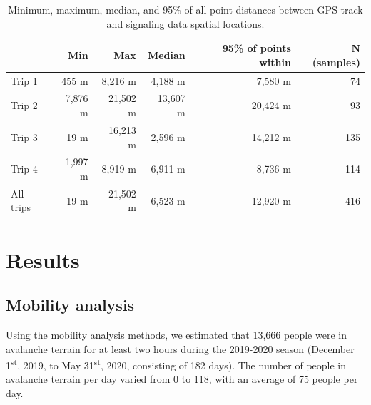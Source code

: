 \documentclass[authordate,empirical]{jote-new-article}
\begin{document}
\begin{table}[t]
  \begin{fullwidth}

    \centering
    \caption{Minimum, maximum, median, and 95\% of all point distances between GPS track and signaling data spatial locations.}
    \begin{tabular}{@{} l r r r r r @{}}
      \toprule
                                     & \textbf{Min} & \textbf{Max} &
      \textbf{Median}                &
      \textbf{95\% of points within} &
      \textbf{N (samples)}                                           \\
      \midrule

      Trip 1                         & 455 m        & 8,216 m      &
      4,188 m                        & 7,580 m      & 74             \\

      Trip 2                         & 7,876 m      & 21,502 m     &
      13,607 m                       & 20,424 m     & 93             \\

      Trip 3                         & 19 m         & 16,213 m     &
      2,596 m                        & 14,212 m     & 135            \\

      Trip 4                         & 1,997 m      & 8,919 m      &
      6,911 m                        & 8,736 m      & 114            \\

      All trips                      & 19 m         & 21,502 m     &
      6,523 m                        & 12,920 m     & 416            \\
      \bottomrule
    \end{tabular}
  \end{fullwidth}
\end{table}



\section{Results}



\subsection{Mobility analysis}



Using the mobility analysis methods, we estimated that 13,666 people were in avalanche terrain for at least two hours during the 2019-2020 season (December 1\textsuperscript{st}, 2019, to May 31\textsuperscript{st}, 2020, consisting of 182 days). The number of people in avalanche terrain per day varied from 0 to 118, with an average of 75 people per day.
\end{document}
